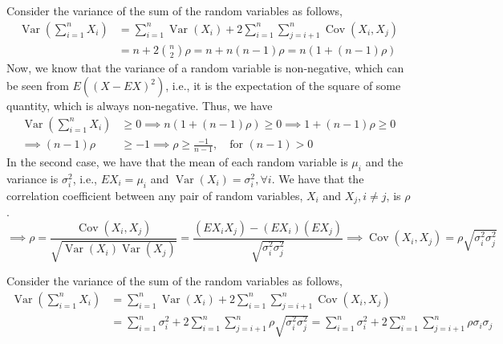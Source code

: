 Consider the variance of the sum of the random variables as follows,
\begin{align*}
    \operatorname{Var}\left(\sum_{i=1}^{n} X_{i}\right)
     & =
    \sum_{i=1}^{n} \operatorname{Var}\left(X_{i}\right)
    + 2 \sum_{i=1}^{n} \sum_{j=i+1}^{n} \operatorname{Cov}\left(X_{i}, X_{j}\right)
    \\ & =
    n + 2 \binom{n}{2} \rho
    =
    n + n(n-1) \rho
    =
    n(1 + (n-1) \rho)
\end{align*}
Now, we know that the variance of a random variable is non-negative, which can be seen from \( E({(X - E X)}^{2}) \), i.e., it is the expectation of the square of some quantity, which is always non-negative.
Thus, we have
\begin{align*}
    \operatorname{Var}\left(\sum_{i=1}^{n} X_{i}\right)
     & \geq
    0
    \implies
    n(1 + (n-1) \rho)
    \geq
    0
    \implies
    1 + (n-1) \rho
    \geq
    0
    \\
    \implies
    (n-1) \rho
     & \geq
    -1
    \implies
    \boxed{
        \rho
        \geq
        \frac{-1}{n-1}
    }
    , \quad \text{for } (n - 1) > 0
\end{align*}
In the second case, we have that the mean of each random variable is \( \mu_{i} \) and the variance is \( \sigma_{i}^{2} \), i.e., \( E X_{i}=\mu_{i} \) and \( \operatorname{Var}\left(X_{i}\right)=\sigma_{i}^{2}, \forall i \).
We have that the correlation coefficient between any pair of random variables, \( X_{i} \) and \( X_{j}, i \neq j \), is \( \rho \).
\begin{equation*}
    \implies
    \rho
    =
    \frac{\operatorname{Cov}\left(X_{i}, X_{j}\right)}{\sqrt{\operatorname{Var}\left(X_{i}\right) \operatorname{Var}\left(X_{j}\right)}}
    =
    \frac{(E X_{i} X_{j}) - (E X_{i})(E X_{j})}{\sqrt{\sigma_{i}^{2} \sigma_{j}^{2}}}
    \implies
    \operatorname{Cov}\left(X_{i}, X_{j}\right)
    =
    \rho \sqrt{\sigma_{i}^{2} \sigma_{j}^{2}}
\end{equation*}

Consider the variance of the sum of the random variables as follows,
\begin{align*}
    \operatorname{Var}\left(\sum_{i=1}^{n} X_{i}\right)
     & =
    \sum_{i=1}^{n} \operatorname{Var}\left(X_{i}\right)
    + 2 \sum_{i=1}^{n} \sum_{j=i+1}^{n} \operatorname{Cov}\left(X_{i}, X_{j}\right)
    \\ & =
    \sum_{i=1}^{n} \sigma_{i}^{2}
    + 2 \sum_{i=1}^{n} \sum_{j=i+1}^{n} \rho \sqrt{\sigma_{i}^{2} \sigma_{j}^{2}}
    =
    \sum_{i=1}^{n} \sigma_{i}^{2}
    + 2 \sum_{i=1}^{n} \sum_{j=i+1}^{n} \rho \sigma_{i} \sigma_{j}
\end{align*}
